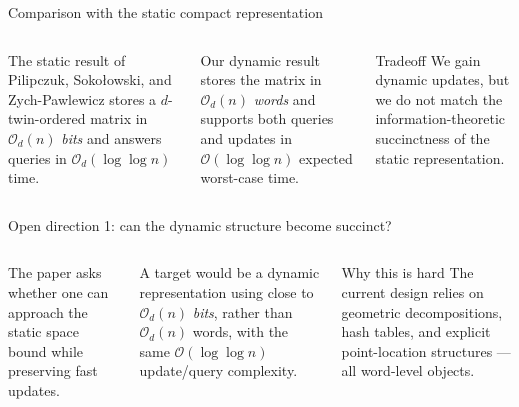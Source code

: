 \documentclass[aspectratio=169,professionalfonts]{beamer}
\newcommand{\Oh}{\mathcal{O}}
\begin{document}
\begin{frame}[t]{Comparison with the static compact representation}
\begin{columns}[T,totalwidth=\textwidth]
The static result of Pilipczuk, Soko\l{}owski, and Zych-Pawlewicz stores a $d$-twin-ordered matrix in $\Oh_d(n)$ \emph{bits} and answers queries in $\Oh_d(\log\log n)$ time.
\medskip

Our dynamic result stores the matrix in $\Oh_d(n)$ \emph{words} and supports both queries and updates in $\Oh(\log\log n)$ expected worst-case time.
\begin{block}{Tradeoff}
We gain dynamic updates, but we do not match the information-theoretic succinctness of the static representation.
\end{block}
\centering
{}
\end{columns}
\end{frame}

\begin{frame}[t]{Open direction 1: can the dynamic structure become succinct?}
\begin{columns}[T,totalwidth=\textwidth]
The paper asks whether one can approach the static space bound while preserving fast updates.
\medskip

A target would be a dynamic representation using close to $\Oh_d(n)$ \emph{bits}, rather than $\Oh_d(n)$ words, with the same $\Oh(\log\log n)$ update/query complexity.
\begin{block}{Why this is hard}
The current design relies on geometric decompositions, hash tables, and explicit point-location structures --- all word-level objects.
\end{block}
\centering
{}
\end{columns}
\end{frame}
\end{document}
